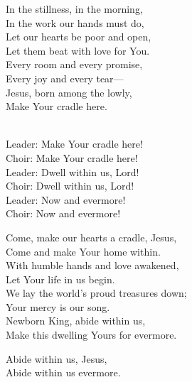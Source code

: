\begin{lyrics}
In the stillness, in the morning,\\
In the work our hands must do,\\
Let our hearts be poor and open,\\
Let them beat with love for You.\\
Every room and every promise,\\
Every joy and every tear—\\
Jesus, born among the lowly,\\
Make Your cradle here.

\\
Leader: Make Your cradle here!\\
Choir: Make Your cradle here!\\
Leader: Dwell within us, Lord!\\
Choir: Dwell within us, Lord!\\
Leader: Now and evermore!\\
Choir: Now and evermore!

Come, make our hearts a cradle, Jesus,\\
Come and make Your home within.\\
With humble hands and love awakened,\\
Let Your life in us begin.\\
We lay the world’s proud treasures down;\\
Your mercy is our song.\\
Newborn King, abide within us,\\
Make this dwelling Yours for evermore.

Abide within us, Jesus,\\
Abide within us evermore.
\end{lyrics}

